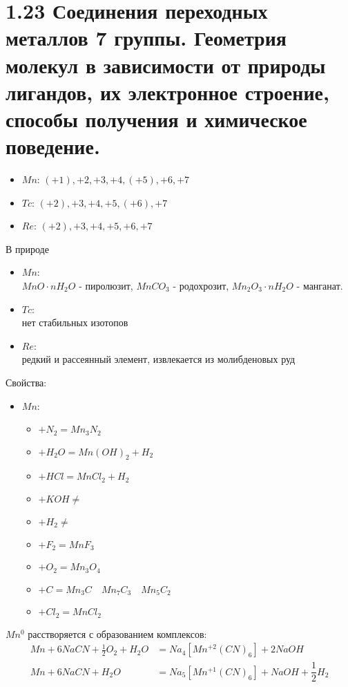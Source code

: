 \section*{1.23 Соединения переходных металлов 7 группы. Геометрия молекул в зависимости от природы лигандов, их электронное строение, способы получения и химическое поведение.}
\begin{itemize}
	\item $Mn$: $(+1), +2, +3, +4, (+5), +6, +7$	
	\item $Tc$: $(+2), +3, +4, +5, (+6), +7$
	\item $Re$: $(+2), +3, +4, +5, +6, +7$
\end{itemize}
В природе 
\begin{itemize}
	\item $Mn$: \\
	$MnO \cdot nH_2O$ - пиролюзит, $MnCO_3$ - родохрозит, $Mn_2O_3 \cdot nH_2O$ - манганат.
	\item $Tc$: \\
	нет стабильных изотопов
	\item $Re$: \\
	редкий и рассеянный  элемент, извлекается из молибденовых руд
\end{itemize}
Свойства:
\begin{itemize}
	\item $Mn$:
	\begin{itemize}
		\item $+ N_2 = Mn_3N_2 $
		\item $+ H_2O = Mn(OH)_2 + H_2 $
		\item $+ HCl = MnCl_2 + H_2 $
		\item $+ KOH \not =  $
		\item $+ H_2 \not = $
		\item $+ F_2  = MnF_3$
		\item $+ O_2 = Mn_3O_4 $
		\item $+ C = Mn_3C \quad Mn_7C_3 \quad Mn_5C_2 $
		\item $+ Cl_2 =  MnCl_2 $		
	\end{itemize}
\end{itemize}
$Mn^0$ расстворяется с образованием комплексов:
\begin{align*}
Mn + 6 NaCN + \frac12 O_2 + H_2O &= Na_4\left[Mn^{+2}(CN)_6\right] + 2NaOH \\
Mn + 6 NaCN + H_2O &= Na_5\left[Mn^{+1}(CN)_6\right] + NaOH + \dfrac12 H_2
\end{align*}
\begin{figure} [H]
	\centering {\texttt{[image: zz1]}}
\end{figure}
